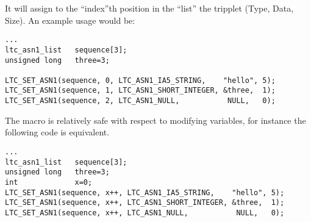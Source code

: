 \documentclass[a4paper]{book}
\begin{document}
It will assign to the ``index''th position in the ``list'' the tripplet (Type, Data, Size).  An example usage would be:

\begin{small}
\begin{verbatim}
...
ltc_asn1_list   sequence[3];
unsigned long   three=3;

LTC_SET_ASN1(sequence, 0, LTC_ASN1_IA5_STRING,    "hello", 5);
LTC_SET_ASN1(sequence, 1, LTC_ASN1_SHORT_INTEGER, &three,  1);
LTC_SET_ASN1(sequence, 2, LTC_ASN1_NULL,           NULL,   0);
\end{verbatim}
\end{small}

The macro is relatively safe with respect to modifying variables, for instance the following code is equivalent.

\begin{small}
\begin{verbatim}
...
ltc_asn1_list   sequence[3];
unsigned long   three=3;
int             x=0;
LTC_SET_ASN1(sequence, x++, LTC_ASN1_IA5_STRING,    "hello", 5);
LTC_SET_ASN1(sequence, x++, LTC_ASN1_SHORT_INTEGER, &three,  1);
LTC_SET_ASN1(sequence, x++, LTC_ASN1_NULL,           NULL,   0);
\end{verbatim}
\end{small}
\end{document}
